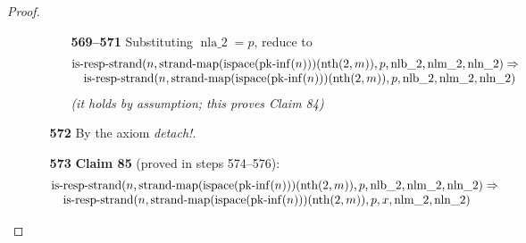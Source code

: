 \documentclass[11pt]{article}
\theoremstyle{plain}
\begin{document}
\begin{proof}
\begin{itemize}[leftmargin=2.8em, itemsep=4pt, parsep=1pt]
\begin{itemize}[leftmargin=2.8em, itemsep=4pt, parsep=1pt]
  \begin{itemize}[leftmargin=2.8em, itemsep=4pt, parsep=1pt]
  \item[\textbf{569--571}] Substituting $\operatorname{nla\_2} = p$, reduce to
\begin{equation*}
\begin{array}{@{}l@{}} \operatorname{is\text{-}resp\text{-}strand}(n, \operatorname{strand\text{-}map}(\operatorname{ispace}(\operatorname{pk\text{-}inf}(n)))(\operatorname{nth}(2, m)), p, \operatorname{nlb\_2}, \operatorname{nlm\_2}, \operatorname{nln\_2}) \Rightarrow  \\ \quad \operatorname{is\text{-}resp\text{-}strand}(n, \operatorname{strand\text{-}map}(\operatorname{ispace}(\operatorname{pk\text{-}inf}(n)))(\operatorname{nth}(2, m)), p, \operatorname{nlb\_2}, \operatorname{nlm\_2}, \operatorname{nln\_2}) \end{array}
\end{equation*}
  \emph{(it holds by assumption; this proves Claim 84)}
  \end{itemize}
  \item[\textbf{572}] By the axiom \emph{detach!}.
  \item[\textbf{573}] \textbf{Claim 85} (proved in steps 574--576):
\begin{equation*}
\begin{array}{@{}l@{}} \operatorname{is\text{-}resp\text{-}strand}(n, \operatorname{strand\text{-}map}(\operatorname{ispace}(\operatorname{pk\text{-}inf}(n)))(\operatorname{nth}(2, m)), p, \operatorname{nlb\_2}, \operatorname{nlm\_2}, \operatorname{nln\_2}) \Rightarrow  \\ \quad \operatorname{is\text{-}resp\text{-}strand}(n, \operatorname{strand\text{-}map}(\operatorname{ispace}(\operatorname{pk\text{-}inf}(n)))(\operatorname{nth}(2, m)), p, x, \operatorname{nlm\_2}, \operatorname{nln\_2}) \end{array}
\end{equation*}


\end{itemize}
\end{itemize}
\end{proof}
\end{document}
